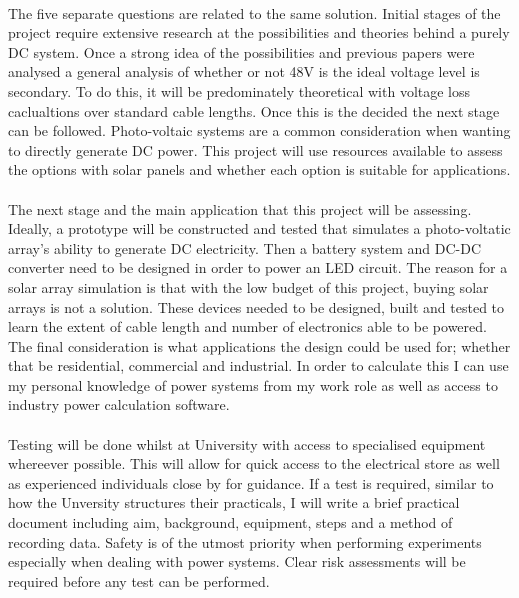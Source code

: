 \paragraph{}
The five separate questions are related to the same solution. Initial stages of the project require extensive research at the possibilities and theories behind a purely DC system. Once a strong idea of the possibilities and previous papers were analysed a general analysis of whether or not 48V is the ideal voltage level is secondary. To do this, it will be predominately theoretical with voltage loss caclualtions over standard cable lengths. Once this is the decided the next stage can be followed. Photo-voltaic systems are a common consideration when wanting to directly generate DC power. This project will use resources available to assess the options with solar panels and whether each option is suitable for applications. 

\paragraph{}
The next stage and the main application that this project will be assessing. Ideally, a prototype will be constructed and tested that simulates a photo-voltatic array's ability to generate DC electricity. Then a battery system and DC-DC converter need to be designed in order to power an LED circuit. The reason for a solar array simulation is that with the low budget of this project, buying solar arrays is not a solution. These devices needed to be designed, built and tested to learn the extent of cable length and number of electronics able to be powered. The final consideration is what applications the design could be used for; whether that be residential, commercial and industrial. In order to calculate this I can use my personal knowledge of power systems from my work role as well as access to industry power calculation software. 

\paragraph{}
Testing will be done whilst at University with access to specialised equipment whereever possible. This will allow for quick access to the electrical store as well as experienced individuals close by for guidance. If a test is required, similar to how the Unversity structures their practicals, I will write a brief practical document including aim, background, equipment, steps and a method of recording data. Safety is of the utmost priority when performing experiments especially when dealing with power systems. Clear risk assessments will be required before any test can be performed. 

